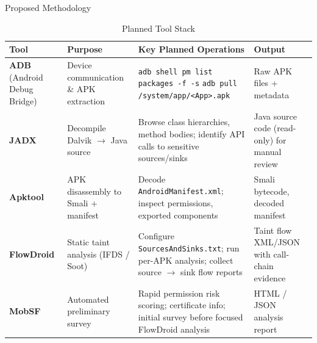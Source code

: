 \documentclass[aspectratio=169]{beamer}
\begin{document}
\begin{frame}{Proposed Methodology}
\begin{table}[ht]
    \centering
    \caption{Planned Tool Stack}
    \tiny
    \begin{tabular}{|p{0.9in}|p{1.2in}|p{2.0in}|p{1.5in}|}
    \hline
    \textbf{Tool} & \textbf{Purpose} & \textbf{Key Planned Operations} & \textbf{Output} \\
    \hline
    \vspace{1mm}
    \textbf{ADB} (Android Debug Bridge) &
    Device communication \& APK extraction &
    \texttt{adb shell pm list packages -f -s} \newline
    \texttt{adb pull /system/app/<App>.apk} &
    Raw APK files + metadata \\
    \hline
    \vspace{1mm}
    \textbf{JADX} &
    Decompile Dalvik $\rightarrow$ Java source &
    Browse class hierarchies, method bodies; identify API calls to sensitive sources/sinks &
    Java source code (read-only) for manual review \\
    \hline
    \vspace{1mm}
    \textbf{Apktool} &
    APK disassembly to Smali + manifest &
    Decode \texttt{AndroidManifest.xml}; inspect permissions, exported components &
    Smali bytecode, decoded manifest \\
    \hline
    \vspace{1mm}
    \textbf{FlowDroid} &
    Static taint analysis (IFDS / Soot) &
    Configure \texttt{SourcesAndSinks.txt}; run per-APK analysis; collect source $\rightarrow$ sink flow reports &
    Taint flow XML/JSON with call-chain evidence \\
    \hline
    \vspace{1mm}
    \textbf{MobSF} &
    Automated preliminary survey &
    Rapid permission risk scoring; certificate info; initial survey before focused FlowDroid analysis &
    HTML / JSON analysis report \\
    \hline
    \end{tabular}
\end{table}
\end{frame}
\end{document}
